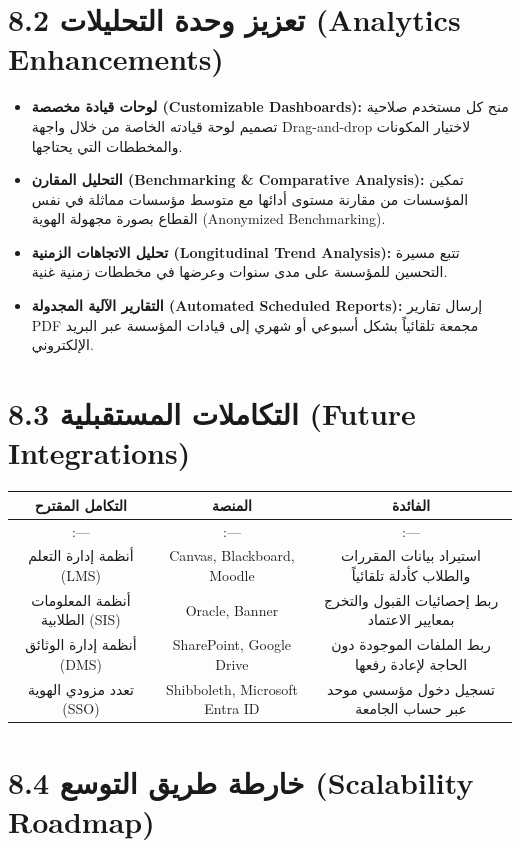 \documentclass[12pt, a4paper]{report}
\begin{document}
\begin{english}
{\section*{8.2 تعزيز وحدة التحليلات (Analytics Enhancements)}

\begin{itemize}
\item \textbf{لوحات قيادة مخصصة (Customizable Dashboards):} منح كل مستخدم صلاحية تصميم لوحة قيادته الخاصة من خلال واجهة Drag-and-drop لاختيار المكونات والمخططات التي يحتاجها.
\item \textbf{التحليل المقارن (Benchmarking & Comparative Analysis):} تمكين المؤسسات من مقارنة مستوى أدائها مع متوسط مؤسسات مماثلة في نفس القطاع بصورة مجهولة الهوية (Anonymized Benchmarking).
\item \textbf{تحليل الاتجاهات الزمنية (Longitudinal Trend Analysis):} تتبع مسيرة التحسين للمؤسسة على مدى سنوات وعرضها في مخططات زمنية غنية.
\item \textbf{التقارير الآلية المجدولة (Automated Scheduled Reports):} إرسال تقارير PDF مجمعة تلقائياً بشكل أسبوعي أو شهري إلى قيادات المؤسسة عبر البريد الإلكتروني.
\end{itemize}

\section*{8.3 التكاملات المستقبلية (Future Integrations)}

\begin{longtable}{|c|c|c|}
\hline
التكامل المقترح & المنصة & الفائدة \\ \hline
:--- & :--- & :--- \\ \hline
أنظمة إدارة التعلم (LMS) & Canvas, Blackboard, Moodle & استيراد بيانات المقررات والطلاب كأدلة تلقائياً \\ \hline
أنظمة المعلومات الطلابية (SIS) & Oracle, Banner & ربط إحصائيات القبول والتخرج بمعايير الاعتماد \\ \hline
أنظمة إدارة الوثائق (DMS) & SharePoint, Google Drive & ربط الملفات الموجودة دون الحاجة لإعادة رفعها \\ \hline
تعدد مزودي الهوية (SSO) & Shibboleth, Microsoft Entra ID & تسجيل دخول مؤسسي موحد عبر حساب الجامعة \\ \hline
\end{longtable}

\section*{8.4 خارطة طريق التوسع (Scalability Roadmap)}

}
\end{english}
\end{document}
